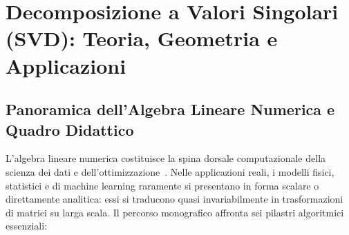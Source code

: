 \chapter[Decomposizione a Valori Singolari (SVD)]{Decomposizione a Valori Singolari (SVD): Teoria, Geometria e Applicazioni}
\label{chap:decomposizione-valori-singolari-svd}

\FloatBarrier
\section{Panoramica dell'Algebra Lineare Numerica e Quadro Didattico}
\label{sec:svd-panoramica-didattica}

L'algebra lineare numerica costituisce la spina dorsale computazionale della scienza dei dati e dell'ottimizzazione~\cite{demmel1997applied,trefethen1997numerical}. Nelle applicazioni reali, i modelli fisici, statistici e di machine learning raramente si presentano in forma scalare o direttamente analitica: essi si traducono quasi invariabilmente in trasformazioni di matrici su larga scala. Il percorso monografico affronta sei pilastri algoritmici essenziali:

